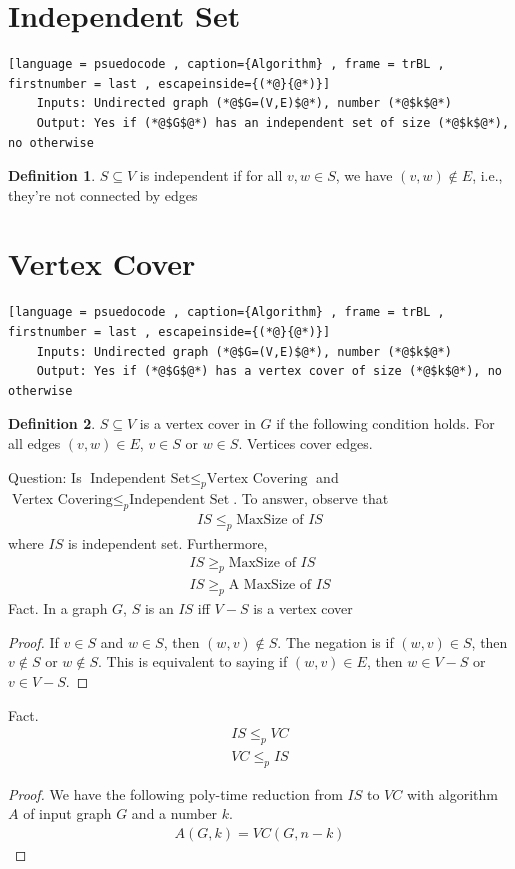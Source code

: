 \documentclass[a4paper]{article}
\theoremstyle{plain}
\theoremstyle{definition}
\newtheorem{defn}{Definition}[section]
\theoremstyle{remark}
\begin{document}
	\section{Independent Set}
	\begin{lstlisting}[language = psuedocode , caption={Algorithm} , frame = trBL , firstnumber = last , escapeinside={(*@}{@*)}]
	Inputs: Undirected graph (*@$G=(V,E)$@*), number (*@$k$@*)
	Output: Yes if (*@$G$@*) has an independent set of size (*@$k$@*), no otherwise
	\end{lstlisting}	
	\begin{defn}
		$S \subseteq V$ is independent if for all $v,w \in S$, we have $(v,w) \not\in E$, i.e., they're not connected by edges
	\end{defn}
	\section{Vertex Cover}
	\begin{lstlisting}[language = psuedocode , caption={Algorithm} , frame = trBL , firstnumber = last , escapeinside={(*@}{@*)}]
	Inputs: Undirected graph (*@$G=(V,E)$@*), number (*@$k$@*)
	Output: Yes if (*@$G$@*) has a vertex cover of size (*@$k$@*), no otherwise
	\end{lstlisting}	
	\begin{defn}
		$S \subseteq V$ is a vertex cover in $G$ if the following condition holds. For all edges $(v,w) \in E$, $v \in S$ or $w \in S$. Vertices cover edges.
	\end{defn}
	Question: Is $\text{Independent Set} \le_p \text{Vertex Covering}$ and $\text{Vertex Covering}\le_p \text{Independent Set}$. To answer, observe that
	\begin{align*}
		IS \le_p \text{MaxSize of }IS
	\end{align*}
	where $IS$ is independent set. Furthermore,
	\begin{align*}
		IS \ge_p \text{MaxSize of }IS \\
		IS \ge_p \text{A MaxSize of }IS
	\end{align*}
	Fact. In a graph $G$, $S$ is an $IS$ iff $V-S$ is a vertex cover
	\begin{proof}
		If $v \in S$ and $w \in S$, then $(w,v) \not\in S$. The negation is if $(w,v) \in S$, then $v \not\in S$ or $w \not\in S$. This is equivalent to saying if $(w,v) \in E$, then $w \in V-S$ or $v \in V-S$.
	\end{proof}
	Fact.
	\begin{align*}
		IS \le_p VC \\
		VC \le_p IS
	\end{align*}
	\begin{proof}
		We have the following poly-time reduction from $IS$ to $VC$ with algorithm $A$ of input graph $G$ and a number $k$.
		\begin{align*}
			A(G,k) = VC(G,n-k)
		\end{align*}
	\end{proof}
\end{document}
